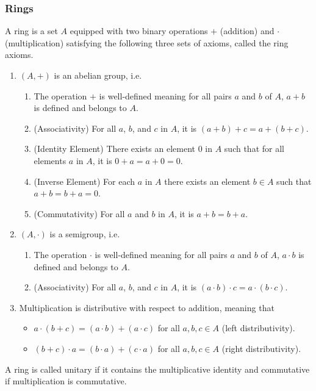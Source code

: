\subsubsection*{Rings}
\begin{defbox}
    \begin{definition}[Ring]
        A {\color{maththen}ring} is a {\color{mathobj}set} \(A\) equipped with two {\color{mathobj}binary operations} \(+\) ({\color{mathrem}addition}) and \(\cdot\) ({\color{mathrem}multiplication}) satisfying the following three sets of {\color{mathrem}axioms}, called the {\color{mathrem}ring axioms}.
    \begin{enumerate}
      \item \((A, +)\) is an {\color{mathif}abelian group}, i.e.
      \begin{enumerate}
        \item The operation \(+\) is well-defined meaning for all pairs \(a\) and \(b\) of \(A\), \(a + b\) is defined and belongs to \(A\).
        \item (Associativity) For all \(a\), \(b\), and \(c\) in \(A\), it is \((a + b) + c = a + (b + c)\).
        \item (Identity Element) There exists an element \(0\) in \(A\) such that for all elements \(a\) in \(A\), it is \(0 + a = a + 0 = 0\).
        \item (Inverse Element) For each \(a\) in \(A\) there exists an element \(b \in A\) such that \(a + b = b + a = 0\).
        \item (Commutativity) For all \(a\) and \(b\) in \(A\), it is \(a + b = b + a\).
      \end{enumerate}
      \item \((A, \cdot)\) is a {\color{mathif}semigroup}, i.e.
      \begin{enumerate}
        \item The operation \(\cdot\) is well-defined meaning for all pairs \(a\) and \(b\) of \(A\), \(a \cdot b\) is defined and belongs to \(A\).
        \item (Associativity) For all \(a\), \(b\), and \(c\) in \(A\), it is \((a \cdot b) \cdot c = a \cdot (b \cdot c)\).
      \end{enumerate}
      \item {\color{mathobj}Multiplication} is {\color{mathif}distributive} with respect to {\color{mathobj}addition}, meaning that
      \begin{itemize}
        \item \(a \cdot (b + c) = (a \cdot b) + (a \cdot c)\) for all \(a, b, c \in A\) ({\color{mathrem}left distributivity}).
        \item \((b + c) \cdot a = (b \cdot a) + (c \cdot a)\) for all \(a, b, c \in A\) ({\color{mathrem}right distributivity}).
      \end{itemize}
    \end{enumerate}
    A {\color{mathobj}ring} is called {\color{maththen}unitary} if it {\color{mathif}contains} the {\color{mathobj}multiplicative identity} and {\color{maththen}commutative} if {\color{mathobj}multiplication} is {\color{mathif}commutative}.
    \end{definition}
\end{defbox}
